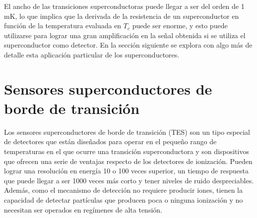 El ancho de las transiciones superconductoras puede llegar a ser del orden de 1\,mK, lo que implica que la derivada de la resistencia de un superconductor en función de la temperatura evaluada en $T_c$ puede ser enorme, y esto puede utilizarse para lograr una gran amplificación en la señal obtenida si se utiliza el superconductor como detector. En la sección siguiente se explora con algo más de detalle esta aplicación particular de los superconductores.
\section{Sensores superconductores de borde de transición}\label{S:tes}
Los sensores superconductores de borde de transición (TES) son un tipo especial de detectores que están diseñados para operar en el pequeño rango de temperaturas en el que ocurre una transición superconductora y son dispositivos que ofrecen una serie de ventajas respecto de los detectores de ionización. Pueden lograr una resolución en energía 10 o 100 veces superior, un tiempo de respuesta que puede llegar a ser 1000 veces más corto y tener niveles de ruido despreciables. Además, como el mecanismo de detección no requiere producir iones, tienen la capacidad de detectar partículas que producen poca o ninguna ionización\cite{Mccammon2005,Smith2012,Hilton1998} y no necesitan ser operados en regímenes de alta tensión.

